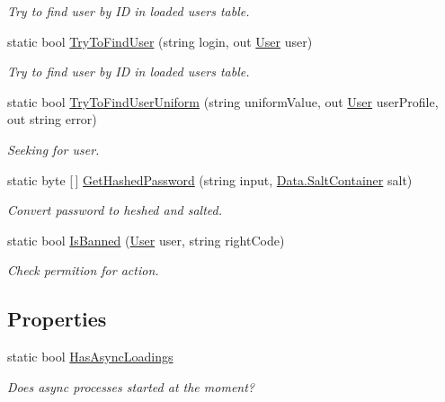 \begin{DoxyCompactItemize}
\begin{DoxyCompactList}\small\item\em Try to find user by ID in loaded users table. \end{DoxyCompactList}\item 
static bool \mbox{\hyperlink{class_authority_controller_1_1_a_p_i_1_1_users_a3e152e5b11636c72e5e9610906de986a}{Try\+To\+Find\+User}} (string login, out \mbox{\hyperlink{class_authority_controller_1_1_data_1_1_user}{User}} user)
\begin{DoxyCompactList}\small\item\em Try to find user by ID in loaded users table. \end{DoxyCompactList}\item 
static bool \mbox{\hyperlink{class_authority_controller_1_1_a_p_i_1_1_users_a7890ae58af943645c6b6cfc39f0d3e6f}{Try\+To\+Find\+User\+Uniform}} (string uniform\+Value, out \mbox{\hyperlink{class_authority_controller_1_1_data_1_1_user}{User}} user\+Profile, out string error)
\begin{DoxyCompactList}\small\item\em Seeking for user. \end{DoxyCompactList}\item 
static byte \mbox{[}$\,$\mbox{]} \mbox{\hyperlink{class_authority_controller_1_1_a_p_i_1_1_users_a9a1f211c403459ac15b312504444f0c2}{Get\+Hashed\+Password}} (string input, \mbox{\hyperlink{class_authority_controller_1_1_data_1_1_salt_container}{Data.\+Salt\+Container}} salt)
\begin{DoxyCompactList}\small\item\em Convert password to heshed and salted. \end{DoxyCompactList}\item 
static bool \mbox{\hyperlink{class_authority_controller_1_1_a_p_i_1_1_users_ab23c24d29e83e28d25452f7da05b427d}{Is\+Banned}} (\mbox{\hyperlink{class_authority_controller_1_1_data_1_1_user}{User}} user, string right\+Code)
\begin{DoxyCompactList}\small\item\em Check permition for action. \end{DoxyCompactList}\end{DoxyCompactItemize}
\subsection*{Properties}
\begin{DoxyCompactItemize}
\item 
static bool \mbox{\hyperlink{class_authority_controller_1_1_a_p_i_1_1_users_ac4f1b22cd4a3e351ba6f7e438abead57}{Has\+Async\+Loadings}}
\begin{DoxyCompactList}\small\item\em Does async processes started at the moment? \end{DoxyCompactList}\end{DoxyCompactItemize}
